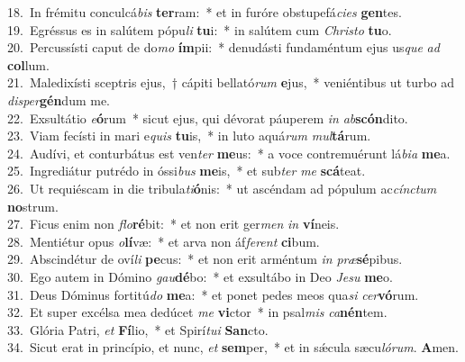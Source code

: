 {18.~}In frémitu conculcá\textit{bis} \textbf{ter}ram:~* et in furóre obstupefá\textit{ci}\textit{es} \textbf{gen}tes.\\
{19.~}Egréssus es in salútem pópu\textit{li} \textbf{tu}i:~* in salútem cum \textit{Chri}\textit{sto} \textbf{tu}o.\\
{20.~}Percussísti caput de do\textit{mo} \textbf{ím}pii:~* denudásti fundaméntum ejus us\textit{que} \textit{ad} \textbf{col}lum.\\
{21.~}Maledixísti sceptris ejus,~† cápiti bellató\textit{rum} \textbf{e}jus,~* veniéntibus ut turbo ad \textit{di}\textit{sper}\textbf{gén}dum me.\\
{22.~}Exsultátio \textit{e}\textbf{ó}rum~* sicut ejus, qui dévorat páuperem \textit{in} \textit{ab}\textbf{scón}dito.\\
{23.~}Viam fecísti in mari e\textit{quis} \textbf{tu}is,~* in luto aquá\textit{rum} \textit{mul}\textbf{tá}rum.\\
{24.~}Audívi, et conturbátus est ven\textit{ter} \textbf{me}us:~* a voce contremuérunt lá\textit{bi}\textit{a} \textbf{me}a.\\
{25.~}Ingrediátur putrédo in óssi\textit{bus} \textbf{me}is,~* et sub\textit{ter} \textit{me} \textbf{scá}teat.\\
{26.~}Ut requiéscam in die tribula\textit{ti}\textbf{ó}nis:~* ut ascéndam ad pópulum ac\textit{cín}\textit{ctum} \textbf{no}strum.\\
{27.~}Ficus enim non \textit{flo}\textbf{ré}bit:~* et non erit ger\textit{men} \textit{in} \textbf{ví}neis.\\
{28.~}Mentiétur opus \textit{o}\textbf{lí}væ:~* et arva non áf\textit{fe}\textit{rent} \textbf{ci}bum.\\
{29.~}Abscindétur de oví\textit{li} \textbf{pe}cus:~* et non erit arméntum \textit{in} \textit{præ}\textbf{sé}pibus.\\
{30.~}Ego autem in Dómino \textit{gau}\textbf{dé}bo:~* et exsultábo in Deo \textit{Je}\textit{su} \textbf{me}o.\\
{31.~}Deus Dóminus fortitú\textit{do} \textbf{me}a:~* et ponet pedes meos qua\textit{si} \textit{cer}\textbf{vó}rum.\\
{32.~}Et super excélsa mea dedúcet \textit{me} \textbf{vi}ctor~* in psal\textit{mis} \textit{ca}\textbf{nén}tem.\\
{33.~}Glória Patri, \textit{et} \textbf{Fí}lio,~* et Spirí\textit{tu}\textit{i} \textbf{San}cto.\\
{34.~}Sicut erat in princípio, et nunc, \textit{et} \textbf{sem}per,~* et in sǽcula sæcu\textit{ló}\textit{rum}. \textbf{A}men.\\
